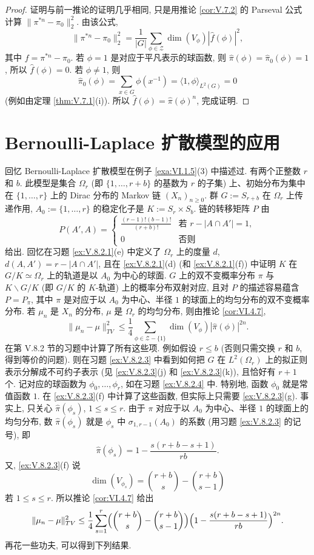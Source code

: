 \begin{proof}
证明与前一推论的证明几乎相同, 只是用推论 \ref{cor:V.7.2} 的 Parseval 公式计算 $\|\pi^{*n} - \pi_0\|_2^2$. 由该公式,
\[
\|\pi^{*n} - \pi_0\|_2^2 = \frac{1}{|G|}\sum_{\phi \in \mathcal{Z}}\dim(V_{\phi})|\hat{f}(\phi)|^2,
\]
其中 $f = \pi^{*n} - \pi_0$. 若 $\phi = 1$ 是对应于平凡表示的球函数, 则 $\hat{\pi}(\phi) = \hat{\pi}_0(\phi) = 1$, 所以 $\hat{f}(\phi) = 0$. 若 $\phi \neq 1$, 则
\[
\hat{\pi}_0(\phi) = \sum_{x \in G}\phi(x^{-1}) = \langle 1, \phi \rangle_{L^2(G)} = 0
\]
(例如由定理 \ref{thm:V.7.1}(i)). 所以 $\hat{f}(\phi) = \hat{\pi}(\phi)^n$, 完成证明.
\end{proof}

\section{Bernoulli-Laplace 扩散模型的应用}
回忆 Bernoulli-Laplace 扩散模型在例子 \ref{exa:VI.1.5}(3) 中描述过. 有两个正整数 $r$ 和 $b$. 此模型是集合 $\Omega_r$ (即 $\{1, \ldots, r + b\}$ 的基数为 $r$ 的子集) 上、初始分布为集中在 $\{1, \ldots, r\}$ 上的 Dirac 分布的 Markov 链 $(X_n)_{n \geq 0}$. 群 $G := S_{r+b}$ 在 $\Omega_r$ 上传递作用, $A_0 := \{1, \ldots, r\}$ 的稳定化子是 $K := S_r \times S_b$. 链的转移矩阵 $P$ 由
\[
P(A', A) = \begin{cases} \frac{(r-1)!(b-1)!}{(r+b)!} & \text{若 } r - |A \cap A'| = 1, \\ 0 & \text{否则} \end{cases}
\]
给出.
回忆在习题 \ref{ex:V.8.2.1}(e) 中定义了 $\Omega_r$ 上的度量 $d$, $d(A, A') = r - |A \cap A'|$, 且在 \ref{ex:V.8.2.1}(d) (和 \ref{ex:V.8.2.1}(f)) 中证明 $K$ 在 $G/K \simeq \Omega_r$ 上的轨道是以 $A_0$ 为中心的球面. $G$ 上的双不变概率分布 $\pi$ 与 $K\backslash G/K$ (即 $G/K$ 的 $K$-轨道) 上的概率分布双射对应, 且对 $P$ 的描述容易蕴含 $P = P_{\pi}$, 其中 $\pi$ 是对应于以 $A_0$ 为中心、半径 $1$ 的球面上的均匀分布的双不变概率分布.
若 $\mu_n$ 是 $X_n$ 的分布, $\mu$ 是 $\Omega_r$ 的均匀分布, 则由推论 \ref{cor:VI.4.7},
\[
\|\mu_n - \mu\|_{TV}^2 \leq \frac{1}{4}\sum_{\phi \in \mathcal{Z} - \{1\}}\dim(V_{\phi})|\hat{\pi}(\phi)|^{2n}.
\]
在第 V.8.2 节的习题中计算了所有这些项. 例如假设 $r \leq b$ (否则只需交换 $r$ 和 $b$, 得到等价的问题). 则在习题 \ref{ex:V.8.2.3} 中看到如何把 $G$ 在 $L^2(\Omega_r)$ 上的拟正则表示分解成不可约子表示 (见 \ref{ex:V.8.2.3}(j) 和 \ref{ex:V.8.2.3}(k)), 且恰好有 $r + 1$ 个. 记对应的球函数为 $\phi_0, \ldots, \phi_r$, 如在习题 \ref{ex:V.8.2.4} 中. 特别地, 函数 $\phi_0$ 就是常值函数 $1$. 在 \ref{ex:V.8.2.3}(f) 中计算了这些函数, 但实际上只需要 \ref{ex:V.8.2.3}(g). 事实上, 只关心 $\hat{\pi}(\phi_s)$, $1 \leq s \leq r$. 由于 $\pi$ 对应于以 $A_0$ 为中心、半径 $1$ 的球面上的均匀分布, 数 $\hat{\pi}(\phi_s)$ 就是 $\phi_s$ 中 $\sigma_{1,r-1}(A_0)$ 的系数 (用习题 \ref{ex:V.8.2.3} 的记号), 即
\[
\hat{\pi}(\phi_s) = 1 - \frac{s(r + b - s + 1)}{rb}.
\]
又, \ref{ex:V.8.2.3}(f) 说
\[
\dim(V_{\phi_s}) = \binom{r+b}{s} - \binom{r+b}{s-1}
\]
若 $1 \leq s \leq r$.
所以推论 \ref{cor:VI.4.7} 给出
\[
\|\mu_n - \mu\|_{TV}^2 \leq \frac{1}{4}\sum_{s=1}^r\Bigl(\binom{r+b}{s} - \binom{r+b}{s-1}\Bigr)\Bigl(1 - \frac{s(r + b - s + 1)}{rb}\Bigr)^{2n}.
\]
再花一些功夫, 可以得到下列结果.

